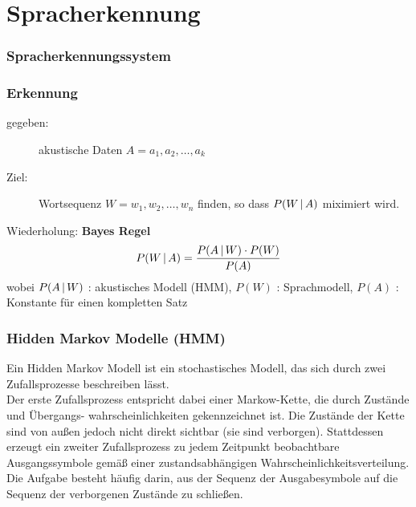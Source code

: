 
\chapter{Spracherkennung}

\subsection{Spracherkennungssystem}




\subsection{Erkennung}

\begin{description}
\item[gegeben:] akustische Daten $A = a_1,a_2,\dots,a_k$
\item[Ziel:] Wortsequenz $W = w_1,w_2,\dots,w_n$ finden, so dass $P(W \, | \, A)$ miximiert wird.
\end{description}

Wiederholung: \textbf{Bayes Regel} $$P(W \, | \, A) = \frac{P(A \, | \, W) \cdot P(W)}{P(A)}$$ wobei $P(A \, | \, W)$ : akustisches Modell (HMM), $P(W)$ : Sprachmodell, $P(A)$ : Konstante für einen kompletten Satz

\subsection{Hidden Markov Modelle (HMM)}

Ein Hidden Markov Modell ist ein stochastisches Modell, das sich durch zwei Zufallsprozesse beschreiben lässt. \\
Der erste Zufallsprozess entspricht dabei einer Markow-Kette, die durch Zustände und Übergangs- wahrscheinlichkeiten gekennzeichnet ist. Die Zustände der Kette sind von außen jedoch nicht direkt sichtbar (sie sind verborgen). Stattdessen erzeugt ein zweiter Zufallsprozess zu jedem Zeitpunkt beobachtbare Ausgangssymbole gemäß einer zustandsabhängigen Wahrscheinlichkeitsverteilung. Die Aufgabe besteht häufig darin, aus der Sequenz der Ausgabesymbole auf die Sequenz der verborgenen Zustände zu schließen.

